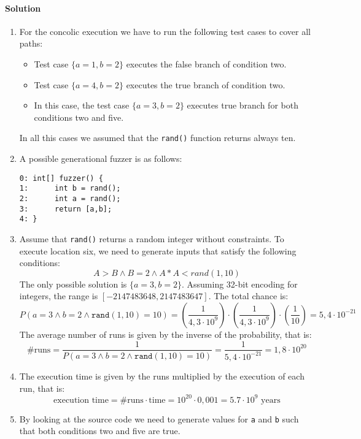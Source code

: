 \paragraph*{Solution}
\begin{enumerate}
    \item For the concolic execution we have to run the following test cases to cover all paths: 
        \begin{itemize}
            \item Test case $\{a = 1, b = 2\}$ executes the false branch of condition two.
            \item Test case $\{a = 4, b = 2\}$ executes the true branch of condition two. 
            \item In this case, the test case $\{a=3, b=2\}$ executes true branch for both conditions two and five. 
        \end{itemize}
        In all this cases we assumed that the \texttt{rand()} function returns always ten. 
    \item A possible generational fuzzer is as follows: 
        \begin{lstlisting}[style=C]
0: int[] fuzzer() {
1:      int b = rand();
2:      int a = rand();
3:      return [a,b]; 
4: }
        \end{lstlisting}
    \item Assume that \texttt{rand()} returns a random integer without constraints. 
        To execute location six, we need to generate inputs that satisfy the following conditions: 
        \[A>B \land B=2 \land A*A<rand(1,10)\]
        The only possible solution is $\{a=3,b=2\}$. 
        Assuming 32-bit encoding for integers, the range is $[-2147483648, 2147483647]$. 
        The total chance is: 
        \[P(a=3 \land b=2 \land \texttt{rand}(1,10)=10)=\left(\dfrac{1}{4,3\cdot 10^9}\right)\cdot\left(\dfrac{1}{4,3\cdot 10^9}\right)\cdot\left(\dfrac{1}{10}\right)=5,4\cdot 10^{-21}\]
        The average number of runs is given by the inverse of the probability, that is: 
        \[\# \text{runs}= \dfrac{1}{P(a=3 \land b=2 \land \texttt{rand}(1,10)=10)}=\dfrac{1}{5,4\cdot 10^{-21}}=1,8 \cdot 10^{20}\]
    \item The execution time is given by the runs multiplied by the execution of each run, that is: 
        \[\text{execution time}=\# \text{runs} \cdot \text{time}= 10^{20} \cdot 0,001 =5.7\cdot 10^{9}  \text{ years}\]
    \item By looking at the source code we need to generate values for \texttt{a} and \texttt{b} such that both conditions two and five are true. 

\end{enumerate}
